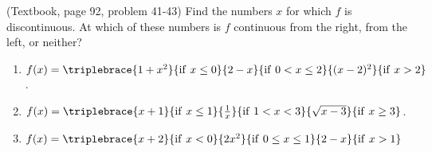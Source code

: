 (Textbook, page 92, problem 41-43)
Find the numbers $x$ for which $f$ is discontinuous. At which of these numbers is $f$ continuous from the right, from the left, or neither? 
\begin{multicols}{2}
\begin{enumerate}
\item $f(x)=\triplebrace{1+x^2}{\mathrm{if~} x\leq 0 } {2-x}{\mathrm{if~} 0<x\leq 2}{(x-2)^2}{\mathrm{if~} x>2}$.
\item $f(x)=\triplebrace{x+1}{\mathrm{if~} x\leq 1 }{\frac{1}{x}}{\mathrm{if~}1<x<3}{\sqrt{x-3}}{\mathrm{if~} x\geq 3}$.
\item $f(x)=\triplebrace{x+2}{\mathrm{if~} x<0}{2x^2}{\mathrm{if~} 0\leq x\leq 1 }{2-x}{\mathrm{if~}x>1 }$
\end{enumerate}
\end{multicols}
